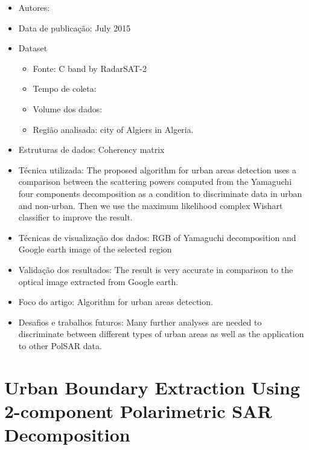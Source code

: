 \documentclass[paper=a4, fontsize=11pt]{scrartcl}
\begin{document}
\begin{itemize}
    \item Autores:~\cite{azmedroub2015urban}
    \item Data de publicação: July 2015
    \item Dataset
    \begin{itemize}
        \item Fonte: C band by RadarSAT-2
        \item Tempo de coleta:
        \item Volume dos dados:
        \item Região analisada: city of Algiers in Algeria.
    \end{itemize}
    \item Estruturas de dados: Coherency matrix
    \item Técnica utilizada: The proposed algorithm for urban areas detection uses a comparison between the scattering powers computed from the Yamaguchi four components decomposition as a condition to discriminate data in urban and non-urban. Then we use the maximum likelihood complex Wishart classifier to improve the result.
    \item Técnicas de visualização dos dados: RGB of Yamaguchi decomposition and Google earth image of the selected region
    \item Validação dos resultados: The result is very accurate in comparison to the optical image extracted from Google earth.
    \item Foco do artigo: Algorithm for urban areas detection.
    \item Desafios e trabalhos futuros: Many further analyses are needed to discriminate between different types of urban areas as well as the application to other PolSAR data.
\end{itemize}

\newpage

\section*{Urban Boundary Extraction Using 2-component Polarimetric SAR Decomposition}
\end{document}
